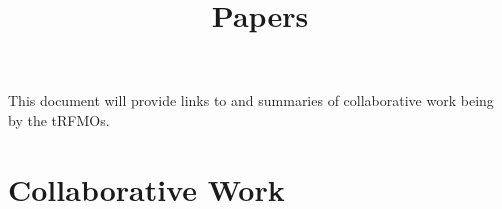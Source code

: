\documentclass[a4paper,10pt]{article}
\title{Papers}
\author{}
\begin{document}
\maketitle

This document will provide links to and summaries of collaborative work being by the tRFMOs.

\section{Collaborative Work}

  
\end{document}
